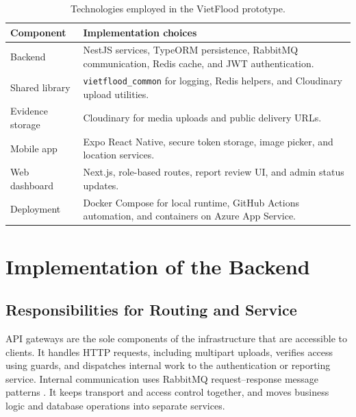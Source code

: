 \begin{table}[htbp]
\centering
\caption{Technologies employed in the VietFlood prototype.}
\label{tab:vietflood-implementation-tools}
\setlength{\tabcolsep}{8pt}
\renewcommand{\arraystretch}{1.18}
\footnotesize
\begin{tabular}{|p{3.2cm}|p{9.3cm}|}
\hline
\textbf{Component} & \textbf{Implementation choices} \\
\hline
Backend & NestJS services, TypeORM persistence, RabbitMQ communication, Redis cache, and JWT authentication. \\
\hline
Shared library & \texttt{vietflood\_common} for logging, Redis helpers, and Cloudinary upload utilities. \\
\hline
Evidence storage & Cloudinary for media uploads and public delivery URLs. \\
\hline
Mobile app & Expo React Native, secure token storage, image picker, and location services. \\
\hline
Web dashboard & Next.js, role-based routes, report review UI, and admin status updates. \\
\hline
Deployment & Docker Compose for local runtime, GitHub Actions automation, and containers on Azure App Service. \\
\hline
\end{tabular}
\end{table}

\section{Implementation of the Backend}

\subsection{Responsibilities for Routing and Service}

API gateways are the sole components of the infrastructure that are accessible to clients. It handles HTTP requests, including multipart uploads, verifies access using guards, and dispatches internal work to the authentication or reporting service. Internal communication uses RabbitMQ request--response message patterns \cite{rabbitmqConfirmsDocs,nestjsMicroservicesDocs}. It keeps transport and access control together, and moves business logic and database operations into separate services.

